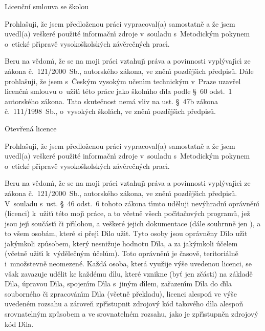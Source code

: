 \sec Licen{\v c}ní smlouva se {\v s}kolou

Prohla\v suji, \v ze jsem p\v redlo\v zenou pr\'aci vypracoval(a) samostatn\v e a \v ze jsem uvedl(a) ve\v sker\'e pou\v zit\'e informa\v cn\'\i{} zdroje v~souladu s~Metodick\'ym pokynem o~etick\'e p\v r\'\i{}prav\v e vysoko\v skolsk\'ych z\'av\v ere\v cn\'ych prac\'\i{}.

		Beru na v\v edom\'\i{}, \v ze se na moji pr\'aci vztahuj\'\i{} pr\'ava a povinnosti vypl\'yvaj\'\i{}c\'\i{} ze z\'akona \v c.~121/2000~Sb., autorsk\'eho z\'akona, ve zn\v en\'\i{} pozd\v ej\v s\'\i{}ch p\v redpis{\r u}. D\'ale prohla\v suji, \v ze jsem s~\v Cesk\'ym vysok\'ym u\v cen\'\i{}m technick\'ym v~Praze uzav\v rel licen\v cn\'\i{} smlouvu o~u\v zit\'\i{} t\'eto pr\'ace jako \v skoln\'\i{}ho d\'\i{}la podle \S{}~60 odst.~1 autorsk\'eho z\'akona. Tato skute\v cnost nem\'a vliv na ust. \S{}~47b z\'akona \v c.~111/1998~Sb., o~vysok\'ych \v skol\'ach, ve zn\v en\'\i{} pozd\v ej\v s\'\i{}ch p\v redpis{\r u}.

\sec Otev{\v r}ená licence

Prohla\v suji, \v ze jsem p\v redlo\v zenou pr\'aci vypracoval(a) samostatn\v e a \v ze jsem uvedl(a) ve\v sker\'e pou\v zit\'e informa\v cn\'\i{} zdroje v~souladu s~Metodick\'ym pokynem o~etick\'e p\v r\'\i{}prav\v e vysoko\v skolsk\'ych z\'av\v ere\v cn\'ych prac\'\i{}.

		Beru na v\v edom\'\i{}, \v ze se na moji pr\'aci vztahuj\'\i{} pr\'ava a povinnosti vypl\'yvaj\'\i{}c\'\i{} ze z\'akona \v c.~121/2000~Sb., autorsk\'eho z\'akona, ve zn\v en\'\i{} pozd\v ej\v s\'\i{}ch p\v redpis{\r u}. V~souladu s~ust. \S{}~46 odst.~6 tohoto z\'akona t\'\i{}mto ud\v eluji nev\'yhradn\'\i{} opr\'avn\v en\'\i{} (licenci) k~u\v zit\'\i{} t\'eto moj\'\i{} pr\'ace, a to v\v cetn\v e v\v sech po\v c\'\i{}ta\v cov\'ych program{\r u}, je\v z jsou jej\'\i{} sou\v c\'ast\'\i{} \v ci p\v r\'\i{}lohou, a ve\v sker\'e jejich dokumentace (d\'ale souhrnn\v e jen ), a to v\v sem osob\'am, kter\'e si p\v rej\'\i{} D\'\i{}lo u\v z\'\i{}t. Tyto osoby jsou opr\'avn\v eny D\'\i{}lo u\v z\'\i{}t jak\'ymkoli zp{\r u}sobem, kter\'y nesni\v zuje hodnotu D\'\i{}la, a za jak\'ymkoli \'u\v celem (v\v cetn\v e u\v zit\'\i{} k~v\'yd\v ele\v cn\'ym \'u\v cel{\r u}m). Toto opr\'avn\v en\'\i{} je \v casov\v e, teritori\'aln\v e i~mno\v zstevn\v e neomezen\'e. Ka\v zd\'a osoba, kter\'a vyu\v zije v\'y\v se
uvedenou licenci, se v\v sak zavazuje ud\v elit ke ka\v zd\'emu d\'\i{}lu, kter\'e vznikne (by\v t jen z\v c\'asti) na z\'aklad\v e D\'\i{}la, \'upravou D\'\i{}la, spojen\'\i{}m D\'\i{}la s~jin\'ym d\'\i{}lem, za\v razen\'\i{}m D\'\i{}la do d\'\i{}la souborn\'eho \v ci zpracov\'an\'\i{}m D\'\i{}la (v\v cetn\v e p\v rekladu), licenci alespo\v n ve v\'y\v se uveden\'em rozsahu a z\'arove\v n zp\v r\'\i{}stupnit zdrojov\'y k\'od takov\'eho d\'\i{}la alespo\v n srovnateln\'ym zp{\r u}sobem a ve srovnateln\'em rozsahu, jako je zp\v r\'\i{}stupn\v en zdrojov\'y k\'od D\'\i{}la.


